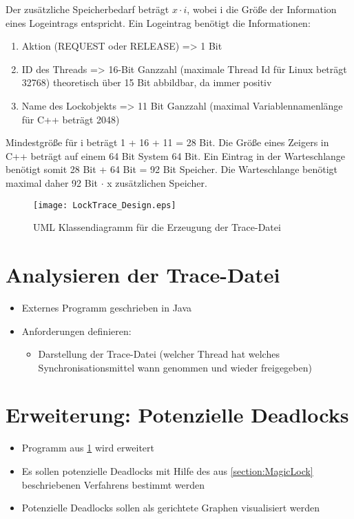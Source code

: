 \begin{itemize}
    Der zusätzliche Speicherbedarf beträgt $x \cdot i$, wobei i die Größe der
    Information eines Logeintrags entspricht. Ein Logeintrag benötigt die
    Informationen:
    \begin{enumerate}
      \item Aktion (REQUEST oder RELEASE) => 1 Bit
      \item ID des Threads => 16-Bit Ganzzahl (maximale Thread Id für Linux
      beträgt 32768) theoretisch über 15 Bit abbildbar, da immer positiv
      \item Name des Lockobjekts => 11 Bit Ganzzahl (maximal Variablennamenlänge
      für C++ beträgt 2048)
    \end{enumerate}
    Mindestgröße für i beträgt 1 + 16 + 11 = 28 Bit. Die Größe eines Zeigers in
    C++ beträgt auf einem 64 Bit System 64 Bit. Ein Eintrag in der Warteschlange
    benötigt somit 28 Bit + 64 Bit = 92 Bit Speicher. Die Warteschlange benötigt
    maximal daher 92 Bit $\cdot$ x zusätzlichen Speicher.
\end{itemize}

\begin{figure}[ht]
  \texttt{[image: LockTrace\_Design.eps]}
  \caption{UML Klassendiagramm für die Erzeugung der Trace-Datei}
  \label{fig:LockTrace_Design}
\end{figure}

\section{Analysieren der Trace-Datei}
\label{section:Analysieren der Trace-Datei}
\begin{itemize}
  \item Externes Programm geschrieben in Java
  \item Anforderungen definieren:
  \begin{itemize}
    \item Darstellung der Trace-Datei (welcher Thread hat welches
    Synchronisationsmittel wann genommen und wieder freigegeben) 
  \end{itemize}
\end{itemize}

\section{Erweiterung: Potenzielle Deadlocks}
\label{section:Erweiterung: Potenzielle Deadlocks}
\begin{itemize}
  \item Programm aus \cref{section:Analysieren der Trace-Datei} wird erweitert
  \item Es sollen potenzielle Deadlocks mit Hilfe des aus \cref{section:MagicLock}
 beschriebenen Verfahrens bestimmt werden
  \item Potenzielle Deadlocks sollen als gerichtete Graphen visualisiert werden
\end{itemize}